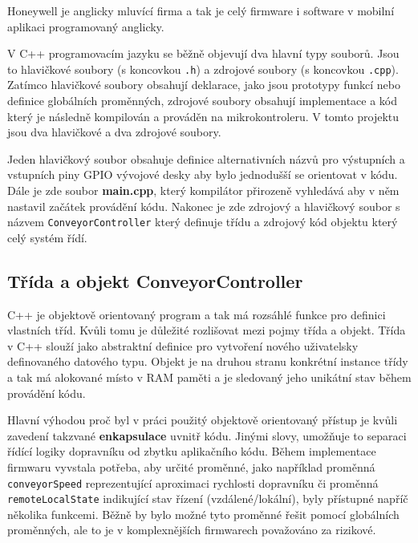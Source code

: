 Honeywell je anglicky mluvící firma a tak je celý firmware i software v mobilní aplikaci programovaný anglicky.

V C++ programovacím jazyku se běžně objevují dva hlavní typy souborů. Jsou to hlavičkové soubory (s koncovkou \texttt{.h}) a zdrojové soubory (s koncovkou \texttt{.cpp}). Zatímco hlavičkové soubory obsahují deklarace, jako jsou prototypy funkcí nebo definice globálních proměnných, zdrojové soubory obsahují implementace a kód který je následně kompilován a prováděn na mikrokontroleru. V tomto projektu jsou dva hlavičkové a dva zdrojové soubory.

Jeden hlavičkový soubor obsahuje definice alternativních názvů pro výstupních a vstupních piny GPIO vývojové desky aby bylo jednodušší se orientovat v kódu. Dále je zde soubor \textbf{main.cpp}, který kompilátor přirozeně vyhledává aby v něm nastavil začátek provádění kódu. Nakonec je zde zdrojový a hlavičkový soubor s názvem \texttt{Con\-ve\-yor\-Con\-tro\-ller} který definuje třídu a zdrojový kód objektu který celý systém řídí.

\subsection{Třída a objekt ConveyorController}\label{sec:ConveyorController}

C++ je objektově orientovaný program a tak má rozsáhlé funkce pro definici vlastních tříd. Kvůli tomu je důležité rozlišovat mezi pojmy třída a objekt. Třída v C++ slouží jako abstraktní definice pro vytvoření nového uživatelsky definovaného datového typu. Objekt je na druhou stranu konkrétní instance třídy a tak má alokované místo v RAM paměti a je sledovaný jeho unikátní stav během provádění kódu.
\cite{CppObjectAndClassArticle}

Hlavní výhodou proč byl v práci použitý objektově orientovaný přístup je kvůli zavedení takzvané \textbf{enkapsulace} uvnitř kódu. Jinými slovy, umožňuje to separaci řídící logiky dopravníku od zbytku aplikačního kódu. Během implementace firmwaru vyvstala potřeba, aby určité proměnné, jako například proměnná \texttt{conveyorSpeed} reprezentující aproximaci rychlosti dopravníku či proměnná \texttt{remoteLocalState} indikující stav řízení (vzdá\-le\-né\-/\-lo\-kál\-ní), byly přístupné napříč několika funkcemi. Běžně by bylo možné tyto proměnné řešit pomocí globálních proměnných, ale to je v komplexnějších firmwarech považováno za rizikové.
\cite{EnkapsulaceVCppArikl}

